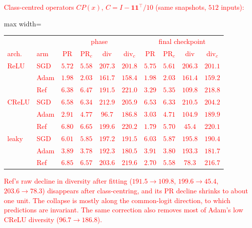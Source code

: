 \documentclass{article}
\newcommand{\nat}[1]{\textcolor{red}{#1}}
\theoremstyle{definition}
\theoremstyle{remark}
\begin{document}
\nat{Class-centred operators $CP(x)$, $C=I-\mathbf1\mathbf1^\top/10$ (same snapshots, $512$ inputs):}
\begin{center}\small
\begin{adjustbox}{max width=\linewidth}
\begin{tabular}{llcccc|cccc}
\toprule
 & & \multicolumn{4}{c|}{\nat{phase}} & \multicolumn{4}{c}{\nat{final checkpoint}} \\
\nat{arch.} & \nat{arm} & \nat{PR} & \nat{PR$_c$} & \nat{div} & \nat{div$_c$} & \nat{PR} & \nat{PR$_c$} & \nat{div} & \nat{div$_c$} \\
\midrule
\nat{ReLU} & \nat{SGD} & \nat{$5.72$} & \nat{$5.58$} & \nat{$207.3$} & \nat{$201.8$} & \nat{$5.75$} & \nat{$5.61$} & \nat{$206.3$} & \nat{$201.1$} \\
 & \nat{Adam} & \nat{$1.98$} & \nat{$2.03$} & \nat{$161.7$} & \nat{$158.4$} & \nat{$1.98$} & \nat{$2.03$} & \nat{$161.4$} & \nat{$159.2$} \\
 & \nat{Ref} & \nat{$6.38$} & \nat{$6.47$} & \nat{$191.5$} & \nat{$\mathbf{221.0}$} & \nat{$3.29$} & \nat{$5.35$} & \nat{$109.8$} & \nat{$\mathbf{218.8}$} \\
\midrule
\nat{CReLU} & \nat{SGD} & \nat{$6.58$} & \nat{$6.34$} & \nat{$212.9$} & \nat{$205.9$} & \nat{$6.53$} & \nat{$6.33$} & \nat{$210.5$} & \nat{$204.2$} \\
 & \nat{Adam} & \nat{$2.91$} & \nat{$4.77$} & \nat{$96.7$} & \nat{$186.8$} & \nat{$3.03$} & \nat{$4.71$} & \nat{$104.9$} & \nat{$189.9$} \\
 & \nat{Ref} & \nat{$6.80$} & \nat{$6.65$} & \nat{$199.6$} & \nat{$\mathbf{220.2}$} & \nat{$1.79$} & \nat{$5.70$} & \nat{$45.4$} & \nat{$\mathbf{220.1}$} \\
\midrule
\nat{leaky} & \nat{SGD} & \nat{$6.01$} & \nat{$5.85$} & \nat{$197.2$} & \nat{$191.5$} & \nat{$6.03$} & \nat{$5.87$} & \nat{$195.8$} & \nat{$190.4$} \\
 & \nat{Adam} & \nat{$3.89$} & \nat{$3.78$} & \nat{$192.3$} & \nat{$180.5$} & \nat{$3.91$} & \nat{$3.80$} & \nat{$193.3$} & \nat{$181.7$} \\
 & \nat{Ref} & \nat{$6.85$} & \nat{$6.57$} & \nat{$203.6$} & \nat{$\mathbf{219.6}$} & \nat{$2.70$} & \nat{$5.58$} & \nat{$78.3$} & \nat{$\mathbf{216.7}$} \\
\bottomrule
\end{tabular}
\end{adjustbox}
\end{center}
\nat{Ref's raw decline in diversity after fitting ($191.5\to109.8$, $199.6\to45.4$, $203.6\to78.3$) disappears after class-centring, and its PR decline shrinks to about one unit. The collapse is mostly along the common-logit direction, to which predictions are invariant. The same correction also removes most of Adam's low CReLU diversity ($96.7\to186.8$).}
\end{document}
